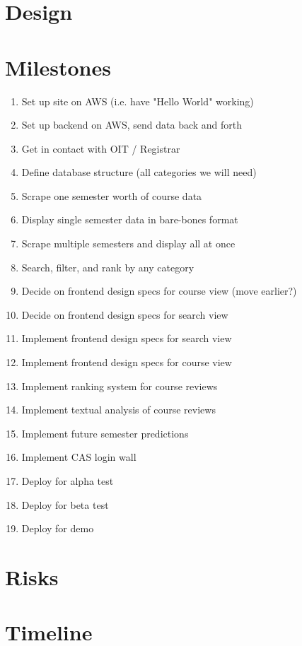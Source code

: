 \documentclass[11pt]{article}
\begin{document}
\section{Design}

\section{Milestones}
\begin{enumerate}
\item Set up site on AWS (i.e. have "Hello World" working)
\item Set up backend on AWS, send data back and forth
\item Get in contact with OIT / Registrar
\item Define database structure (all categories we will need)
\item Scrape one semester worth of course data
\item Display single semester data in bare-bones format
\item Scrape multiple semesters and display all at once
\item Search, filter, and rank by any category
\item Decide on frontend design specs for course view (move earlier?)
\item Decide on frontend design specs for search view
\par [No particular order from here on out]
\item Implement frontend design specs for search view
\item Implement frontend design specs for course view
\item Implement ranking system for course reviews
\item Implement textual analysis of course reviews
\item Implement future semester predictions
\item Implement CAS login wall
\item Deploy for alpha test
\item Deploy for beta test
\item Deploy for demo
\end{enumerate}

\section{Risks}

\section{Timeline}
\end{document}
